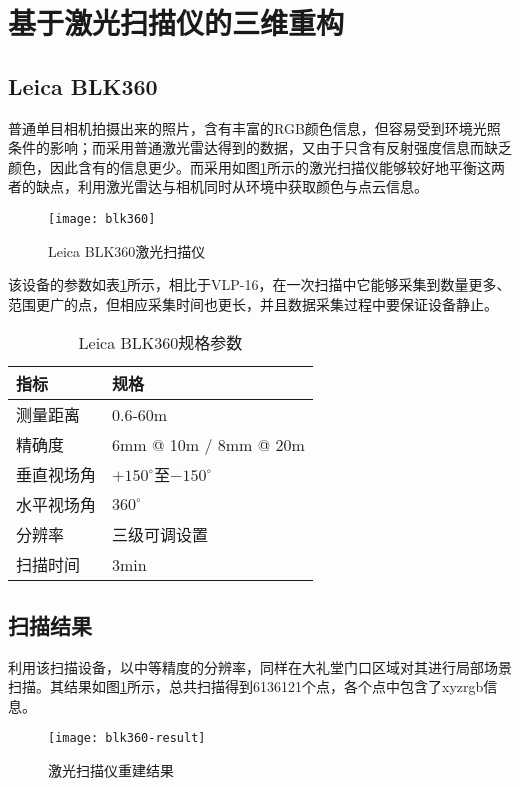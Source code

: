 \section{基于激光扫描仪的三维重构}
\subsection{Leica BLK360}
普通单目相机拍摄出来的照片，含有丰富的RGB颜色信息，但容易受到环境光照条件的影响；而采用普通激光雷达得到的数据，又由于只含有反射强度信息而缺乏颜色，因此含有的信息更少。而采用如图\ref{blk360}所示的激光扫描仪能够较好地平衡这两者的缺点，利用激光雷达与相机同时从环境中获取颜色与点云信息。
\begin{figure}
	\centering
	\texttt{[image: blk360]}
	\caption{Leica BLK360激光扫描仪}
	\label{blk360}
\end{figure}

该设备的参数如表\ref{blk360-parameters}所示，相比于VLP-16，在一次扫描中它能够采集到数量更多、范围更广的点，但相应采集时间也更长，并且数据采集过程中要保证设备静止。
\begin{table}
	\centering
	\caption{Leica BLK360规格参数}
	\begin{tabular}{ll}
		\toprule
		指标 & 规格 \\
		\midrule
		测量距离 & 0.6-60m \\
		精确度 & 6mm @ 10m / 8mm @ 20m \\
		垂直视场角 & $+150^\circ$至$-150^\circ$ \\
		水平视场角 & $360^\circ$ \\
		分辨率 & 三级可调设置 \\
		扫描时间 & 3min \\
		\bottomrule
	\end{tabular}
	\label{blk360-parameters}
\end{table}

\subsection{扫描结果}
利用该扫描设备，以中等精度的分辨率，同样在大礼堂门口区域对其进行局部场景扫描。其结果如图\ref{blk360}所示，总共扫描得到6136121个点，各个点中包含了xyzrgb信息。
\begin{figure}
	\centering
	\texttt{[image: blk360-result]}
	\caption{激光扫描仪重建结果}
	\label{blk360-result}
\end{figure}

